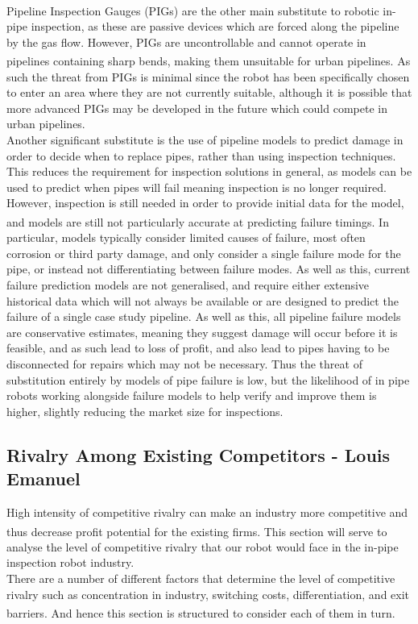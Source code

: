 \documentclass[11pt]{article}		%
\begin{document}
			\\
			Pipeline Inspection Gauges (PIGs) are the other main substitute to robotic in-pipe inspection, as these are passive devices which are forced along the pipeline by the gas flow.
			However, PIGs are uncontrollable and cannot operate in pipelines containing sharp bends\textsuperscript{\cite{mills2017advances}}, making them unsuitable for urban pipelines.
			As such the threat from PIGs is minimal since the robot has been specifically chosen to enter an area where they are not currently suitable, although it is possible that more advanced PIGs may be developed in the future which could compete in urban pipelines.
			\\
			Another significant substitute is the use of pipeline models to predict damage in order to decide when to replace pipes, rather than using inspection techniques.
			This reduces the requirement for inspection solutions in general, as models can be used to predict when pipes will fail meaning inspection is no longer required.
			However, inspection is still needed in order to provide initial data for the model, and models are still not particularly accurate at predicting failure timings\textsuperscript{\cite{zakikhani2020review}}.
			In particular, models typically consider limited causes of failure, most often corrosion or third party damage, and only consider a single failure mode for the pipe, or instead not differentiating between failure modes.
			As well as this, current failure prediction models are not generalised, and require either extensive historical data which will not always be available or are designed to predict the failure of a single case study pipeline.
			As well as this, all pipeline failure models are conservative estimates, meaning they suggest damage will occur before it is feasible, and as such lead to loss of profit, and also lead to pipes having to be disconnected for repairs which may not be necessary.
			Thus the threat of substitution entirely by models of pipe failure is low, but the likelihood of in pipe robots working alongside failure models to help verify and improve them is higher, slightly reducing the market size for inspections.
		
		\subsection[Rivalry Among Existing Competitors]{Rivalry Among Existing Competitors - Louis Emanuel}
			High intensity of competitive rivalry can make an industry more competitive and thus decrease profit potential for the existing firms\textsuperscript{\cite{porter2008five}}. This section will serve to analyse the level of competitive rivalry that our robot would face in the in-pipe inspection robot industry. \\
	        \hspace*{3ex}There are a number of different factors that determine the level of competitive rivalry such as concentration in industry, switching costs, differentiation, and exit barriers\textsuperscript{\cite{rivalryfactorsCI}}. And hence this section is structured to consider each of them in turn. 
	        
\end{document}

